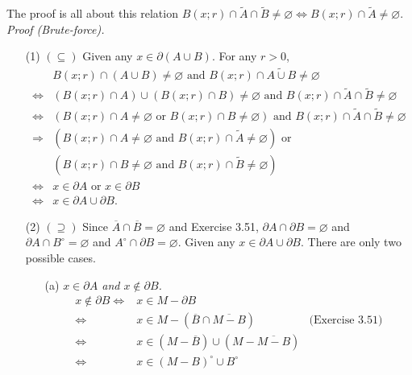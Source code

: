 \documentclass{article}
\begin{document}
The proof is all about this relation
$B(x;r) \cap \widetilde{A} \cap \widetilde{B} \neq \varnothing
\Longleftrightarrow
B(x;r) \cap \widetilde{A} \neq \varnothing.$ \\

\emph{Proof (Brute-force).}
\begin{enumerate}
\item[(1)]
$(\subseteq)$
Given any $x \in \partial(A \cup B)$.
For any $r > 0$,
\begin{align*}
&B(x;r) \cap (A \cup B) \neq \varnothing \text{ and }
B(x;r) \cap \widetilde{A \cup B} \neq \varnothing \\
\Longleftrightarrow&
(B(x;r) \cap A) \cup (B(x;r) \cap B) \neq \varnothing \text{ and }
B(x;r) \cap \widetilde{A} \cap \widetilde{B} \neq \varnothing \\
\Longleftrightarrow&
( B(x;r) \cap A \neq \varnothing
  \text{ or } B(x;r) \cap B \neq \varnothing )
\text{ and }
B(x;r) \cap \widetilde{A} \cap \widetilde{B} \neq \varnothing \\
\Longrightarrow&
( B(x;r) \cap A \neq \varnothing
  \text{ and } B(x;r) \cap \widetilde{A} \neq \varnothing)
\text{ or } \\
&( B(x;r) \cap B \neq \varnothing
  \text{ and } B(x;r) \cap \widetilde{B} \neq \varnothing) \\
\Longleftrightarrow&
x \in \partial A \text{ or } x \in \partial B \\
\Longleftrightarrow&
x \in \partial A \cup \partial B.
\end{align*}
\item[(2)]
$(\supseteq)$
Since $\overline{A} \cap \overline{B} = \varnothing$ and Exercise 3.51,
$\partial A \cap \partial B = \varnothing$
and $\partial A \cap B^{\circ} = \varnothing$
and $A^{\circ} \cap \partial B = \varnothing$.
Given any $x \in \partial A \cup \partial B$.
There are only two possible cases.
  \begin{enumerate}
  \item[(a)]
  \emph{$x \in \partial A$ and $x \not\in \partial B$.}
  \begin{align*}
  x \not\in \partial B
  \Longleftrightarrow&
  x \in M - \partial B \\
  \Longleftrightarrow&
  x \in M - ( \overline{B} \cap \overline{M-B})
    &\text{(Exercise 3.51)} \\
  \Longleftrightarrow&
  x \in (M - \overline{B}) \cup (M - \overline{M-B}) \\
  \Longleftrightarrow&
  x \in (M-B)^{\circ} \cup B^{\circ}

\end{align*}
\end{enumerate}
\end{enumerate}
\end{document}
